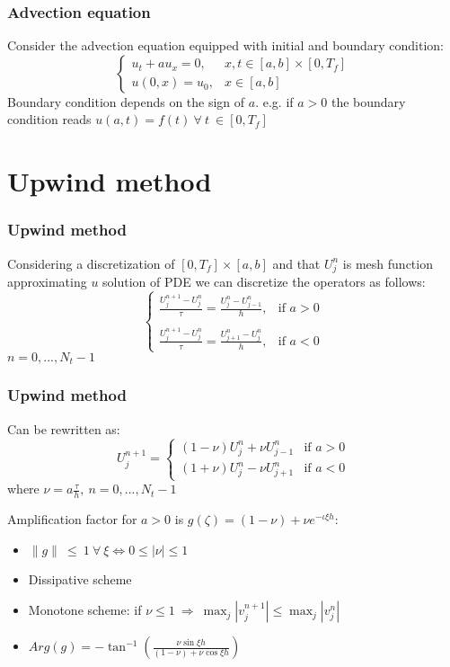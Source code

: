 \documentclass{beamer}
\begin{document}
\begin{frame}
\frametitle{Advection equation}
Consider the advection equation equipped with initial and boundary condition:
$$
\begin{cases}
u_t + a u_x = 0, & x,t \in [a,b] \times [0,T_f] \\
u(0,x) = u_0, & x \in [a,b]
\end{cases}
$$
Boundary condition depends on the sign of $a$. e.g. if $a > 0$ the boundary condition reads $u(a,t) = f(t) \ \forall \ t \ \in [0,T_f]$
\end{frame}
\section{Upwind method}
\begin{frame}
\frametitle{Upwind method}
Considering a discretization of $[0,T_f] \times [a,b]$ and that $U_j^n$ is mesh function approximating $u$ solution of PDE we can discretize the operators as follows:
\[
\begin{cases}
\displaystyle{\frac{U_j^{n+1} - U_j^n}{\tau} = \frac{U_j^n - U_{j-1}^n}{h}}, & \text{if } a > 0 \\ 
\\
\displaystyle{\frac{U_j^{n+1} - U_j^n}{\tau} = \frac{U_{j+1}^n - U_j^n}{h}}, & \text{if } a < 0
\end{cases}
\]
$n = 0, ..., N_t - 1$
\end{frame}
\begin{frame}
\frametitle{Upwind method}
Can be rewritten as:
\[
U_j^{n+1} =
\begin{cases}
(1 - \nu) U_j^n + \nu U_{j - 1}^n & \text{if } a > 0 \\
(1 + \nu) U_j^n - \nu U_{j + 1}^n & \text{if } a < 0
\end{cases}
\]
where $\nu = a \displaystyle{\frac{\tau}{h}}, \ n = 0, ..., N_t - 1$
\end{frame}
\begin{frame}
Amplification factor for $a > 0$ is $g(\zeta) = (1 - \nu) + \nu e^{-\iota \xi h}$:
\begin{itemize}
\item $ \|g\| \ \leq \ 1 \ \forall \ \xi \iff  0 \leq |\nu| \leq 1$
\item Dissipative scheme
\item Monotone scheme: if $\nu \leq 1 \ \Rightarrow \ \max_j{|v_j^{n+1}|} \leq \max_j{|v_j^n|}$
\item $Arg(g) = \displaystyle{-\tan^{-1}\left(\frac{\nu \sin{\xi h}}{(1 - \nu) + \nu \cos{\xi h}}\right)}$
\end{itemize}
\end{frame}
\end{document}
